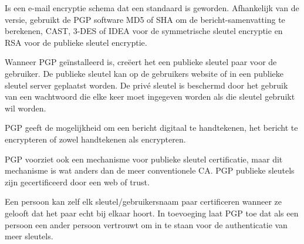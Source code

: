 \noindent Is een e-mail encryptie schema dat een standaard is geworden. Afhankelijk van de versie, gebruikt de PGP software MD5 of SHA om de bericht-samenvatting te berekenen, CAST, 3-DES of IDEA voor de symmetrische sleutel encryptie en RSA voor de publieke sleutel encryptie.

\noindent Wanneer PGP geïnstalleerd is, creëert het een publieke sleutel paar voor de gebruiker. De publieke sleutel kan op de gebruikers website of in een publieke sleutel server geplaatst worden. De privé sleutel is beschermd door het gebruik van een wachtwoord die elke keer moet ingegeven worden als die sleutel gebruikt wil worden.

\noindent PGP geeft de mogelijkheid om een bericht digitaal te handtekenen, het bericht te encrypteren of zowel handtekenen als encrypteren.

\noindent PGP voorziet ook een mechanisme voor publieke sleutel certificatie, maar dit mechanisme is wat anders dan de meer conventionele CA. PGP publieke sleutels zijn gecertificeerd door een web of trust. 

\noindent Een persoon kan zelf elk sleutel/gebruikersnaam paar certificeren wanneer ze gelooft dat het paar echt bij elkaar hoort. In toevoeging laat PGP toe dat als een persoon een ander persoon vertrouwt om in te staan voor de authenticatie van meer sleutels.
